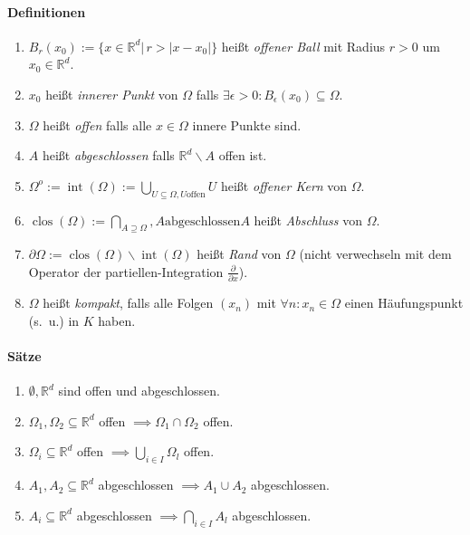 \documentclass[a4paper, 9pt, DIV=24]{scrartcl}
\DeclareMathOperator{\clos}{clos}
\DeclareMathOperator{\Int}{int}
\newcommand{\R}{\mathbb{R}}
\begin{document}
\paragraph{Definitionen}
\begin{enumerate}[label={(}\arabic*{)}]
 \item $B_r(x_0) := \{x \in \R^d \left|\, r > |x-x_0| \right.\}$ heißt \emph{offener Ball} mit Radius $r > 0$ um $x_0 \in\R^d$.
 \item $x_0$ heißt \emph{innerer Punkt} von $\Omega$ falls $\exists \epsilon > 0: B_{\epsilon}(x_0) \subseteq \Omega$.
 \item $\Omega$ heißt \emph{offen} falls alle $x \in \Omega$ innere Punkte sind.
 \item $A$ heißt \emph{abgeschlossen} falls $\R^d\backslash A$ offen ist.
 \item $\Omega^{o} := \Int(\Omega) := \bigcup_{U\subseteq\Omega,U \text{offen}} U$ heißt \emph{offener Kern} von $\Omega$.
 \item $\clos(\Omega) := \bigcap_{A\supseteq \Omega}, A \text{abgeschlossen} A$ heißt \emph{Abschluss} von $\Omega$.
 \item $\partial\Omega := \clos(\Omega)\backslash\Int(\Omega)$ heißt \emph{Rand} von $\Omega$ (nicht verwechseln mit dem Operator der partiellen-Integration $\frac{\partial}{\partial x}$).
 \item $\Omega$ heißt \emph{kompakt}, falls alle Folgen $(x_n)$ mit $\forall n: x_n \in \Omega$ einen Häufungs\-punkt (s.\ u.) in $K$ haben.
\end{enumerate}

\paragraph{Sätze}
\begin{enumerate}[label={(}\arabic*{)}]
 \item $\emptyset, \R^d$ sind offen und abgeschlossen.
 \item $\Omega_1, \Omega_2 \subseteq \R^d$ offen $\implies \Omega_1 \cap \Omega_2$ offen.
 \item $\Omega_i \subseteq \R^d$ offen $\implies \bigcup_{i\in I} \Omega_l$ offen.
 \item $A_1, A_2 \subseteq \R^d$ abgeschlossen $\implies A_1 \cup A_2$ abgeschlossen.
 \item $A_i \subseteq \R^d$ abgeschlossen $\implies \bigcap_{i\in I} A_l$ abgeschlossen.
\end{enumerate}
\end{document}
